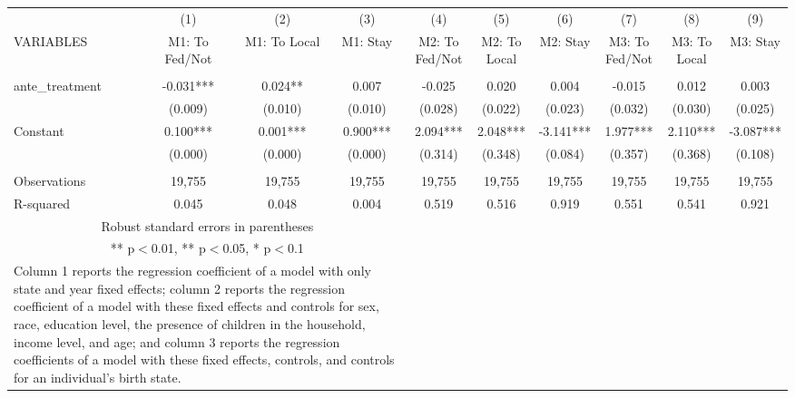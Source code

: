 \begin{tabular}{lccccccccc} \hline
 & (1) & (2) & (3) & (4) & (5) & (6) & (7) & (8) & (9) \\
VARIABLES & M1: To Fed/Not & M1: To Local & M1: Stay & M2: To Fed/Not & M2: To Local & M2: Stay & M3: To Fed/Not & M3: To Local & M3: Stay \\ \hline
 &  &  &  &  &  &  &  &  &  \\
ante\_treatment & -0.031*** & 0.024** & 0.007 & -0.025 & 0.020 & 0.004 & -0.015 & 0.012 & 0.003 \\
 & (0.009) & (0.010) & (0.010) & (0.028) & (0.022) & (0.023) & (0.032) & (0.030) & (0.025) \\
Constant & 0.100*** & 0.001*** & 0.900*** & 2.094*** & 2.048*** & -3.141*** & 1.977*** & 2.110*** & -3.087*** \\
 & (0.000) & (0.000) & (0.000) & (0.314) & (0.348) & (0.084) & (0.357) & (0.368) & (0.108) \\
 &  &  &  &  &  &  &  &  &  \\
Observations & 19,755 & 19,755 & 19,755 & 19,755 & 19,755 & 19,755 & 19,755 & 19,755 & 19,755 \\
 R-squared & 0.045 & 0.048 & 0.004 & 0.519 & 0.516 & 0.919 & 0.551 & 0.541 & 0.921 \\ \hline
\multicolumn{4}{c}{\small Robust standard errors in parentheses} \\
\multicolumn{4}{c}{\small *** p$<$0.01, ** p$<$0.05, * p$<$0.1} \\
\multicolumn{4}{p{0.8\linewidth}}{\small Column 1 reports the
regression coefficient of a model with only state and year fixed effects; column 2 reports the
regression coefficient of a model with these fixed effects and controls for sex, race, education
level, the presence of children in the household, income level, and age; and column 3 reports
the regression coefficients of a model with these fixed effects, controls, and controls for an
individual’s birth state.} \\
\end{tabular}
